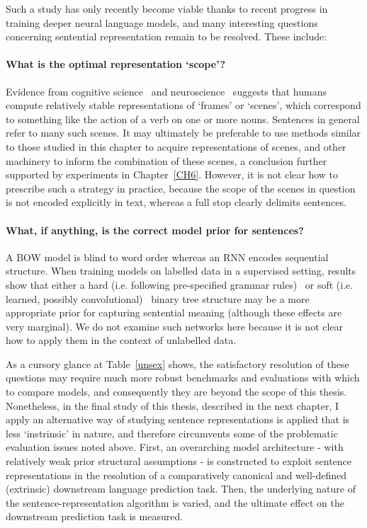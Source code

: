 Such a study has only recently become viable thanks to recent progress in training deeper neural language models, and many interesting questions concerning sentential representation remain to be resolved. These include: 

\paragraph{What is the optimal representation `scope'?} Evidence from cognitive science~\cite{fillmore1985frames} and neuroscience~\cite{ding2016cortical} suggests that humans compute relatively stable representations of `frames' or `scenes', which correspond to something like the action of a verb on one or more nouns. Sentences in general refer to many such scenes. It may ultimately be preferable to use methods similar to those studied in this chapter to acquire representations of scenes, and other machinery to inform the combination of these scenes, a conclusion further supported by experiments in Chapter~\ref{CH6}. However, it is not clear how to prescribe such a strategy in practice, because the scope of the scenes in question is not encoded explicitly in text, whereas a full stop clearly delimits sentences.  

\paragraph{What, if anything, is the correct model prior for sentences?} A BOW model is blind to word order whereas an RNN encodes sequential structure. When training models on labelled data in a supervised setting, results show that either a hard (i.e. following pre-specified grammar rules)~\citep{socher2013recursive} or soft (i.e. learned, possibly convolutional)~\citep{kalchbrenner2014convolutional} binary tree structure may be a more appropriate prior for capturing sentential meaning (although these effects are very marginal). We do not examine such networks here because it is not clear how to apply them in the context of unlabelled data. 

As a cursory glance at Table~\ref{unsex} shows, the satisfactory resolution of these questions may require much more robust benchmarks and evaluations with which to compare models, and consequently they are beyond the scope of this thesis. Nonetheless, in the final study of this thesis, described in the next chapter, I apply an alternative way of studying sentence representations is applied that is less `instrinsic' in nature, and therefore circumvents some of the problematic evaluation issues noted above. First, an overarching model architecture - with relatively weak prior structural assumptions - is constructed to exploit sentence representations in the resolution of a comparatively canonical and well-defined (extrinsic) downstream language prediction task. Then, the underlying nature of the sentence-representation algorithm is varied, and the ultimate effect on the downstream prediction task is measured.    

